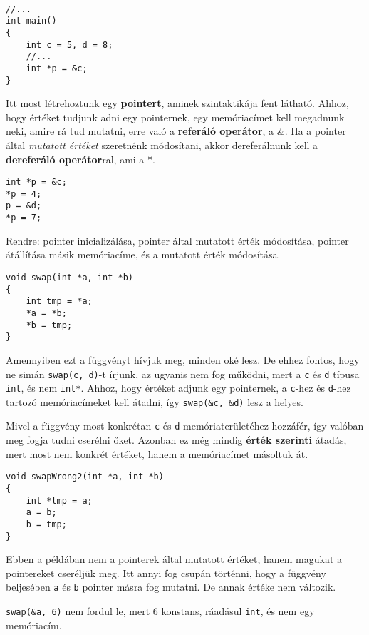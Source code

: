 \documentclass[a4paper,11.5pt]{article}
\begin{document}
	\begin{example}\ 
		
		\begin{lstlisting}
//...
int main()
{
	int c = 5, d = 8;
	//...
	int *p = &c;
}
		\end{lstlisting}
		Itt most létrehoztunk egy \textbf{pointert}, aminek szintaktikája fent látható. Ahhoz, hogy értéket tudjunk adni egy pointernek, egy memóriacímet kell megadnunk neki, amire rá tud mutatni, erre való a \textbf{referáló operátor}, a \&. Ha a pointer által \textit{mutatott értéket} szeretnénk módosítani, akkor dereferálnunk kell a \textbf{dereferáló operátor}ral, ami a *.
		\begin{lstlisting}
int *p = &c;
*p = 4;
p = &d;
*p = 7;
		\end{lstlisting}
		Rendre: pointer inicializálása, pointer által mutatott érték módosítása, pointer átállítása másik memóriacíme, és a mutatott érték módosítása.
		\begin{lstlisting}
void swap(int *a, int *b)
{
	int tmp = *a;
	*a = *b;
	*b = tmp;
}
		\end{lstlisting}
		
		Amennyiben ezt a függvényt hívjuk meg, minden oké lesz. De ehhez fontos, hogy ne simán \texttt{swap(c, d)}-t írjunk, az ugyanis nem fog működni, mert a \texttt{c} és \texttt{d} típusa \texttt{int}, és nem \texttt{int*}. Ahhoz, hogy értéket adjunk egy pointernek, a \texttt{c}-hez és \texttt{d}-hez tartozó memóriacímeket kell átadni, így \texttt{swap(\&c, \&d)} lesz a helyes.
		\bigskip
		
		Mivel a függvény most konkrétan \texttt{c} és \texttt{d} memóriaterületéhez hozzáfér, így valóban meg fogja tudni cserélni őket. Azonban ez még mindig \textbf{érték szerinti} átadás, mert most nem konkrét értéket, hanem a memóriacímet másoltuk át.
		
		\begin{lstlisting}
void swapWrong2(int *a, int *b)
{
	int *tmp = a;
	a = b;
	b = tmp;
}
		\end{lstlisting}
		Ebben a példában nem a pointerek által mutatott értéket, hanem magukat a pointereket cseréljük meg. Itt annyi fog csupán történni, hogy a függvény beljesében \texttt{a} és \texttt{b} pointer másra fog mutatni. De annak értéke nem változik.
		
		\medskip
		\texttt{swap(\&a, 6)} nem fordul le, mert 6 konstans, ráadásul \texttt{int}, és nem egy memóriacím.
	\end{example}
\end{document}
